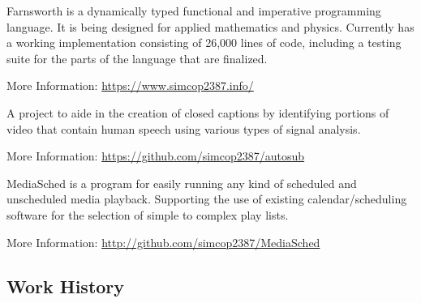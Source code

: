 \documentclass[table,tmargin=1in,bmargin=1in,letterpaper]{resume}
\begin{document}
\begin{compactitem}
\item Farnsworth is a dynamically typed functional and imperative programming language.  
It is being designed for applied mathematics and physics.  Currently has a working implementation 
consisting of 26,000 lines of code, including a testing suite for the parts of the language that are finalized.
\item More Information: \url{https://www.simcop2387.info/}
\end{compactitem}


\begin{compactitem}
\item A project to aide in the creation of closed captions by identifying portions of 
video that contain human speech using various types of signal analysis.
\item More Information: \url{https://github.com/simcop2387/autosub}
\end{compactitem}


\begin{compactitem}
\item MediaSched is a program for easily running any kind of scheduled and unscheduled media playback.  Supporting the use of existing calendar/scheduling software for the selection of simple to complex play lists.
\item More Information: \url{http://github.com/simcop2387/MediaSched}
\end{compactitem}

\vspace{0.2in}

\subsection{Work History}
\end{document}
